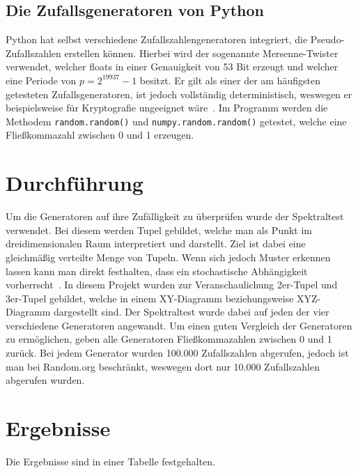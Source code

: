 \documentclass[12pt]{article}
\begin{document}
    \subsection{Die Zufallsgeneratoren von Python}\label{subsec:die-zufallsgeneratoren-von-python}
    Python hat selbst verschiedene Zufallszahlengeneratoren integriert, die Pseudo-Zufallszahlen erstellen können.
    Hierbei wird der sogenannte Mersenne-Twister verwendet, welcher floats in einer Genauigkeit von 53 Bit erzeugt und welcher
    eine Periode von $p=2^{19937}-1$ besitzt.
    Er gilt als einer der am häufigsten getesteten Zufallsgeneratoren, ist jedoch vollständig deterministisch,
    weswegen er beispielsweise für Kryptografie ungeeignet wäre~\cite{python-random,mersenne-twister}.
    Im Programm werden die Methodem \texttt{random.random()} und \texttt{numpy.random.random()} getestet,
    welche eine Fließkommazahl zwischen 0 und 1 erzeugen.

    \section{Durchführung}\label{sec:Durchfuehrung}
    Um die Generatoren auf ihre Zufälligkeit zu überprüfen wurde der Spektraltest verwendet.
    Bei diesem werden Tupel gebildet, welche man als Punkt im dreidimensionalen Raum interpretiert und darstellt.
    Ziel ist dabei eine gleichmäßig verteilte Menge von Tupeln.
    Wenn sich jedoch Muster erkennen lassen kann man direkt festhalten, dass ein stochastische Abhängigkeit vorherrscht~\cite{spektraltest}.
    In diesem Projekt wurden zur Veranschaulichung 2er-Tupel und 3er-Tupel gebildet,
    welche in einem XY-Diagramm beziehungsweise XYZ-Diagramm dargestellt sind.
    Der Spektraltest wurde dabei auf jeden der vier verschiedene Generatoren angewandt.
    Um einen guten Vergleich der Generatoren zu ermöglichen, geben alle Generatoren Fließkommazahlen zwischen 0 und 1 zurück.
    Bei jedem Generator wurden 100.000 Zufallszahlen abgerufen, jedoch ist man bei Random.org beschränkt,
    weswegen dort nur 10.000 Zufallszahlen abgerufen wurden.

    \section{Ergebnisse}\label{sec:Ergebnisse}
    Die Ergebnisse sind in einer Tabelle festgehalten.

    \vfill
\end{document}
